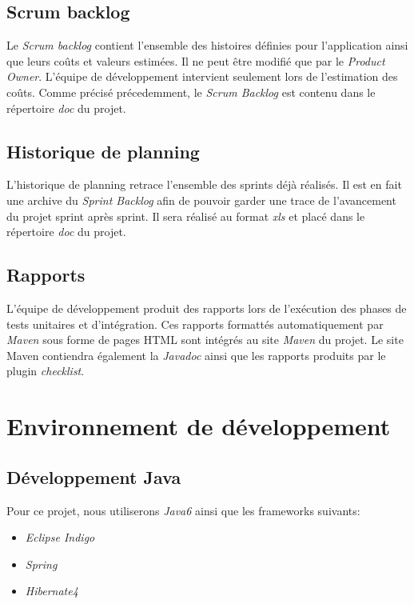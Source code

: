 \documentclass[11pt]{article}
\begin{document}
\subsection{Scrum backlog}

Le \emph{Scrum backlog} contient l'ensemble des histoires définies pour
l'application ainsi que leurs coûts et valeurs estimées. Il ne peut être modifié
que par le \emph{Product Owner}. L'équipe de développement intervient seulement
lors de l'estimation des coûts. Comme précisé précedemment, le \emph{Scrum Backlog} est contenu dans le répertoire \emph{doc} du projet.

\subsection{Historique de planning}

L'historique de planning retrace l'ensemble des sprints déjà réalisés. Il est en fait une archive du \emph{Sprint Backlog} afin de pouvoir garder une trace de l'avancement du projet sprint après sprint. Il sera réalisé au format \emph{xls} et placé dans le répertoire \emph{doc} du projet.

\subsection{Rapports}

L'équipe de développement produit des rapports lors de l'exécution des phases
de tests unitaires et d'intégration. Ces rapports formattés automatiquement
par \emph{Maven} sous forme de pages HTML sont intégrés au site \emph{Maven} du
projet. Le site Maven contiendra également la \emph{Javadoc} ainsi que les rapports produits par le plugin \emph{checklist}.


\section{Environnement de développement}
\label{env-dev}

\subsection{Développement Java}

Pour ce projet, nous utiliserons \emph{Java6} ainsi que les frameworks suivants:

\begin{itemize}
\item \emph{Eclipse Indigo}
\item \emph{Spring}
\item \emph{Hibernate4}
\end{itemize}
\end{document}
